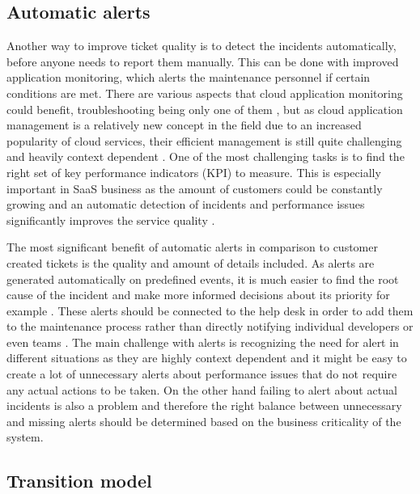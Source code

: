 \subsection{Automatic alerts}
\label{section:alerts-theory}

Another way to improve ticket quality is to detect the incidents automatically, before anyone needs to report them manually. This can be done with improved application
monitoring, which alerts the maintenance personnel if certain conditions are met.
There are various aspects that cloud application monitoring could benefit, troubleshooting being only one of them
\citep{Aceto2013}, but as cloud application management is a relatively new concept in the field due to an increased popularity of cloud services, their efficient management is still
quite challenging and heavily context dependent \citep{Fatema2014}. One of the most challenging tasks is to find the right set of key performance indicators (KPI) to measure.
This is especially important in SaaS business as the amount of customers could be constantly growing and an automatic detection of incidents and performance issues significantly improves
the service quality \citep{Shao2010}.

The most significant benefit of automatic alerts in comparison to customer created tickets is the quality and amount of details included. As alerts are generated automatically
on predefined events, it is much easier to find the root cause of the incident and make more informed decisions about its priority for example \citep{Aceto2013}\citep{Fatema2014}\citep{Shao2010}.
These alerts should be connected to the help desk in order to add them to the maintenance process rather than directly notifying individual
developers or even teams \citep{Hernantes2015}. The main challenge with alerts is recognizing the need for alert in different situations as they are highly context dependent
and it might be easy to create a lot of unnecessary alerts about performance issues that do not require any actual actions to be taken. On the other hand failing to alert about
actual incidents is also a problem and therefore the right balance between unnecessary and missing alerts should be determined based on the business criticality of the system.

\subsection{Transition model}
\label{section:transition-theory}

